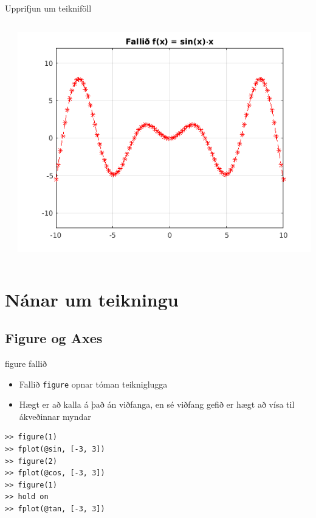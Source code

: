 \documentclass[handout]{beamer}
\begin{document}
\begin{frame}[fragile]{Upprifjun um teikniföll}
\begin{columns}
\inputminted[frame=lines, label=plotexample.m, fontsize=\small]{matlab}{Code/plotexample.m}
\includegraphics[width=\linewidth]{Pics/sintimesx.png}
\end{columns}
\end{frame}

\section{Nánar um teikningu}

\subsection{Figure og Axes}

\begin{frame}[fragile]{figure fallið}
    \begin{itemize}
        \item Fallið \texttt{figure} opnar tóman teikniglugga
        \item Hægt er að kalla á það án viðfanga, en sé viðfang gefið er hægt að vísa til ákveðinnar myndar
    \end{itemize}
    \begin{verbatim}
>> figure(1)
>> fplot(@sin, [-3, 3])
>> figure(2)
>> fplot(@cos, [-3, 3])
>> figure(1)
>> hold on
>> fplot(@tan, [-3, 3])
    \end{verbatim}
\end{frame}
\end{document}
